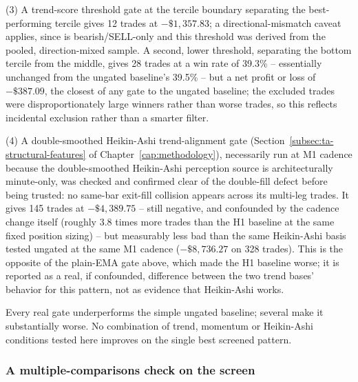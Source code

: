 (3) A trend-score threshold gate at the tercile boundary separating the best-performing tercile gives 12 trades at $-\$1{,}357.83$; a directional-mismatch caveat applies, since  is bearish/SELL-only and this threshold was derived from the pooled, direction-mixed sample. A second, lower threshold, separating the bottom tercile from the middle, gives 28 trades at a win rate of 39.3\% -- essentially unchanged from the ungated baseline's 39.5\% -- but a net profit or loss of $-\$387.09$, the closest of any gate to the ungated baseline; the excluded trades were disproportionately large winners rather than worse trades, so this reflects incidental exclusion rather than a smarter filter.

(4) A double-smoothed Heikin-Ashi trend-alignment gate (Section~\ref{subsec:ta-structural-features} of Chapter~\ref{cap:methodology}), necessarily run at M1 cadence because the double-smoothed Heikin-Ashi perception source is architecturally minute-only, was checked and confirmed clear of the double-fill defect before being trusted: no same-bar exit-fill collision appears across its multi-leg trades. It gives 145 trades at $-\$4{,}389.75$ -- still negative, and confounded by the cadence change itself (roughly 3.8 times more trades than the H1 baseline at the same fixed position sizing) -- but measurably less bad than the same Heikin-Ashi basis tested ungated at the same M1 cadence ($-\$8{,}736.27$ on 328 trades). This is the opposite of the plain-EMA gate above, which made the H1 baseline worse; it is reported as a real, if confounded, difference between the two trend bases' behavior for this pattern, not as evidence that Heikin-Ashi works.

Every real gate underperforms the simple ungated baseline; several make it substantially worse. No combination of trend, momentum or Heikin-Ashi conditions tested here improves on the single best screened pattern.

\subsubsection{A multiple-comparisons check on the screen} \label{subsec:candles-multiple-comparisons}

